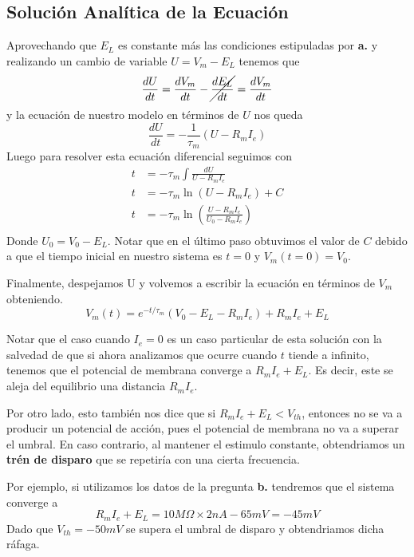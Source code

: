 \documentclass[10pt,journal,compsoc]{IEEEtran}
\begin{document}
\subsection{Solución Analítica de la Ecuación}
Aprovechando que $E_L$ es constante más las condiciones estipuladas por
 \textbf{a.} y realizando un cambio de variable $U = V_m - E_L$  tenemos que
\begin{equation*}
  \frac{dU}{dt} = \frac{dV_m}{dt} - \cancel{\frac{dE_L}{dt}} = \frac{dV_m}{dt}
\end{equation*}
y la ecuación de nuestro modelo en términos de $U$ nos queda
\begin{equation*}
  \frac{dU}{dt} = -\frac{1}{\tau_m}(U - R_m I_e)
\end{equation*}
Luego para resolver esta ecuación diferencial seguimos con
\begin{equation*}
  \begin{aligned}
    t &= -\tau_m \int \frac{dU}{U - R_m I_e} \\
    t &= -\tau_m \ln(U - R_m I_e) + C\\
    t &= -\tau_m \ln\left(\frac{U - R_m I_e}{U_0 - R_m I_e}\right)\\
  \end{aligned}
\end{equation*}
Donde $U_0 = V_0 - E_L$. Notar que en el último paso obtuvimos el valor de $C$
debido a que el tiempo inicial en nuestro sistema es $t = 0$ y $V_m(t = 0) =
V_0$.

Finalmente, despejamos U y volvemos a escribir la ecuación en términos de $V_m$
obteniendo.
\begin{equation*}
  V_m(t) = e^{-t/\tau_m}(V_0 - E_L - R_m I_e) + R_m I_e + E_L
\end{equation*}

Notar que el caso cuando $I_e = 0$ es un caso particular de esta solución con la
salvedad de que si ahora analizamos que ocurre cuando $t$ tiende a infinito,
tenemos que el potencial de membrana converge a $R_m I_e + E_L$. Es decir, este
se aleja del equilibrio una distancia $R_m I_e$.

Por otro lado, esto también nos dice que si $R_m I_e + E_L < V_{th}$, entonces
no se va a producir un potencial de acción, pues el potencial de membrana no va
a superar el umbral. En caso contrario, al mantener el estimulo constante,
obtendriamos un \textbf{trén de disparo} que se repetiría con una cierta
frecuencia.

Por ejemplo, si utilizamos los datos de la pregunta \textbf{b.} tendremos que el
sistema converge a
\begin{equation*}
  R_m I_e + E_L = 10M\Omega \times 2nA - 65mV = -45mV
\end{equation*}
Dado que $V_{th} = -50mV$ se supera el umbral de disparo y obtendriamos dicha
ráfaga.
\end{document}
